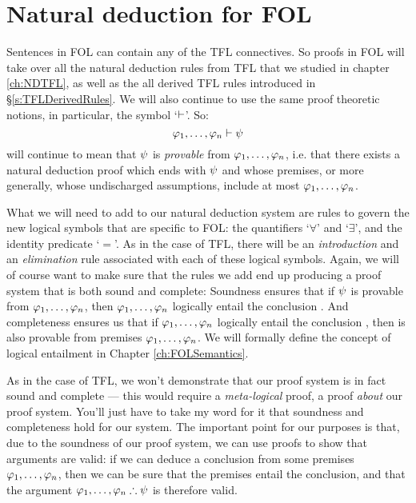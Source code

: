 \chapter{Natural deduction for FOL}\label{ch:NDFOL}


Sentences in FOL can contain any of the TFL connectives. So proofs in FOL will take over all the natural deduction rules from TFL that we studied in chapter \ref{ch:NDTFL}, as well as the all derived  TFL rules introduced in \S \ref{s:TFLDerivedRules}.  We will also continue to use the same proof theoretic notions, in particular, the symbol `$\vdash$'.  So:
$$\mathcal{\varphi}_1, \ldots, \mathcal{\varphi}_n \vdash \mathcal{\psi}$$
will continue to mean that $\mathcal{\psi}$ is \emph{provable} from $\mathcal{\varphi}_1, \ldots, \mathcal{\varphi}_n$, i.e. that there exists a natural deduction proof which ends with $\mathcal{\psi}$ and whose premises, or more generally, whose undischarged assumptions, include at most $\mathcal{\varphi}_1, \ldots, \mathcal{\varphi}_n$.


What we will need to add to our natural deduction system are rules to govern the new logical symbols that are specific to FOL: the quantifiers `$\forall$' and `$\exists$', and the identity predicate `$=$'.  As in the case of TFL, there will be an \emph{introduction} and an \emph{elimination} rule associated with each of these logical symbols.  Again, we will of course want to make sure that the rules we add end up producing a proof system that is both sound and complete:
Soundness ensures that if $\mathcal{\psi}$ is provable from $\mathcal{\varphi}_1, \ldots, \mathcal{\varphi}_n$, then $\mathcal{\varphi}_1, \ldots, \mathcal{\varphi}_n$ logically entail the conclusion \meta{\psi}.  And completeness ensures us that if $\mathcal{\varphi}_1, \ldots, \mathcal{\varphi}_n$ logically entail the conclusion \meta{\psi}, then \meta{\psi} is also provable from premises $\mathcal{\varphi}_1, \ldots, \mathcal{\varphi}_n$.  We will formally define the concept of logical entailment in Chapter \ref{ch:FOLSemantics}.

As in the case of TFL, we won't demonstrate that our proof system is in fact sound and complete --- this would require a \emph{meta-logical} proof, a proof \emph{about} our proof system.  You'll just have to take my word for it that soundness and completeness hold for our system. The important point for our purposes is that, due to the soundness of our proof system, we can use proofs to show that arguments are valid: if we can deduce a conclusion \meta{\psi} from some premises $\mathcal{\varphi}_1, \ldots, \mathcal{\varphi}_n$, then we can be sure that the premises entail the conclusion, and that the argument $\mathcal{\varphi}_1, \ldots, \mathcal{\varphi}_n \therefore \mathcal{\psi}$ is therefore valid.

